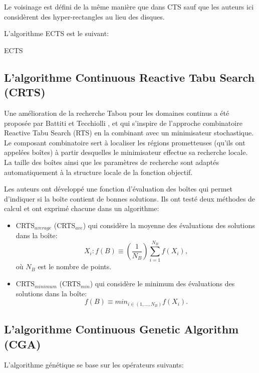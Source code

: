 Le voisinage est défini de la même manière que dans CTS sauf que les auteurs ici considèrent des hyper-rectangles au lieu des disques. 

L'algorithme ECTS est le suivant:\\

\begin{algorithm}[H]
	\caption{ECTS}
\end{algorithm}
\bigskip

\subsection{L'algorithme Continuous Reactive Tabu Search (CRTS)}
\begin{spacing}{1.4}
Une amélioration de la recherche Tabou pour les domaines continus a été proposée par Battiti et Tecchiolli \cite{battiti1996continuous}, et qui s'inspire de l'approche combinatoire Reactive Tabu Search (RTS) en la combinant avec un minimisateur stochastique. Le composant combinatoire sert à localiser les régions prometteuses (qu'ils ont appelées boîtes) à partir desquelles le minimisateur effectue sa recherche locale. La taille des boîtes ainsi que les paramètres de recherche sont adaptés automatiquement à la structure locale de la fonction objectif.\\[2em]
\end{spacing}

Les auteurs ont développé une fonction d'évaluation des boîtes qui permet d'indiquer si la boîte contient de bonnes solutions. Ils ont testé deux méthodes de calcul et ont exprimé chacune dans un algorithme:
\begin{itemize}
	\item CRTS$_{average}$ (CRTS$_{ave}$) qui considère la moyenne des évaluations des solutions dans la boîte:
	$$X_i: f(B)\equiv \left(\frac{1}{N_B}\right)\sum_{i=1}^{N_B}f(X_i),$$ où $N_B$ est le nombre de points.
	\item CRTS$_{minimum}$ (CRTS$_{min}$) qui considère le minimum des évaluations des solutions dans la boîte:
	$$f(B)\equiv min_{i\in(1,...,N_B)} f(X_i).$$
\end{itemize}


\subsection{L'algorithme Continuous Genetic Algorithm (CGA)}
L'algorithme génétique se base sur les opérateurs suivants:


